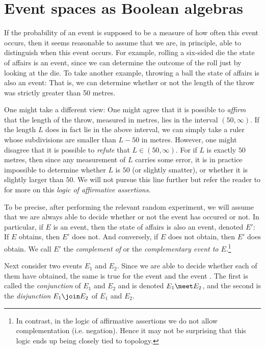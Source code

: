 \documentclass[article, a4paper, 11pt, oneside]{memoir}
\numberwithin{equation}{chapter}
\begin{document}
\chapter{Event spaces as Boolean algebras}

If the probability of an event is supposed to be a measure of how often this event occurs, then it seems reasonable to assume that we are, in principle, able to distinguish when this event occurs. For example, rolling a six-sided die the state of affairs  is an event, since we can determine the outcome of the roll just by looking at the die. To take another example, throwing a ball the state of affairs  is also an event: That is, we can determine whether or not the length of the throw was strictly greater than 50 metres.

One might take a different view: One might agree that it is possible to \emph{affirm} that the length of the throw, measured in metres, lies in the interval $(50,\infty)$. If the length $L$ does in fact lie in the above interval, we can simply take a ruler whose subdivisions are smaller than $L - 50$ in metres. However, one might disagree that it is possible to \emph{refute} that $L \in (50, \infty)$. For if $L$ is exactly $50$ metres, then since any measurement of $L$ carries some error, it is in practice impossible to determine whether $L$ is $50$ (or slightly smatter), or whether it is slightly larger than $50$. We will not pursue this line further but refer the reader to \textcite{vickers1989} for more on this \emph{logic of affirmative assertions}.

To be precise, after performing the relevant random experiment, we will assume that we are always able to decide whether or not the event has occured or not. In particular, if $E$ is an event, then the state of affairs  is also an event, denoted $E'$: If $E$ obtains, then $E'$ does not. And conversely, if $E$ does not obtain, then $E'$ does obtain. We call $E'$ the \emph{complement of} or the \emph{complementary event to $E$}.\footnote{In contrast, in the logic of affirmative assertions we do not allow complementation (i.e. negation). Hence it may not be surprising that this logic ends up being closely tied to topology.}

Next consider two events $E_1$ and $E_2$. Since we are able to decide whether each of them have obtained, the same is true for the event  and the event . The first is called the \emph{conjunction} of $E_1$ and $E_2$ and is denoted $E_1 \meet E_2$, and the second is the \emph{disjunction} $E_1 \join E_2$ of $E_1$ and $E_2$.
\end{document}
